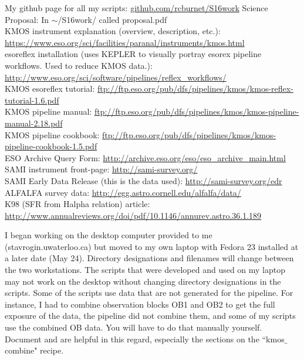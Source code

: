 \documentclass[10pt,letterpaper]{article}
\begin{document}
\begin{thebibliography}{1}
My github page for all my scripts: \url{github.com/rcburnet/S16work}
Science Proposal: In $\sim$/S16work/ called proposal.pdf\\
KMOS instrument explanation (overview, description, etc.): \url{https://www.eso.org/sci/facilities/paranal/instruments/kmos.html}\\
esoreflex installation (uses KEPLER to visually portray esorex pipeline workflows. Used to reduce KMOS data.): \url{http://www.eso.org/sci/software/pipelines/reflex_workflows/}\\
KMOS esoreflex tutorial: \url{ftp://ftp.eso.org/pub/dfs/pipelines/kmos/kmos-reflex-tutorial-1.6.pdf}\\
KMOS pipeline manual: \url{ftp://ftp.eso.org/pub/dfs/pipelines/kmos/kmos-pipeline-manual-2.18.pdf}\\
KMOS pipeline cookbook: \url{ftp://ftp.eso.org/pub/dfs/pipelines/kmos/kmos-pipeline-cookbook-1.5.pdf}\\
ESO Archive Query Form: \url{http://archive.eso.org/eso/eso_archive_main.html}
SAMI instrument front-page: \url{http://sami-survey.org/}\\
SAMI Early Data Release (this is the data used): \url{http://sami-survey.org/edr}\\
ALFALFA survey data: \url{http://egg.astro.cornell.edu/alfalfa/data/}\\
K98 (SFR from Halpha relation) article: \url{http://www.annualreviews.org/doi/pdf/10.1146/annurev.astro.36.1.189}\\

\end{thebibliography}
I began working on the desktop computer provided to me (stavrogin.uwaterloo.ca) but moved to my own laptop with Fedora 23 installed at a later date (May 24). Directory designations and filenames will change between the two workstations. The scripts that were developed and used on my laptop may not work on the desktop without changing directory designations in the scripts. Some of the scripts use data that are not generated for the pipeline. For instance, I had to combine observation blocks OB1 and OB2 to get the full exposure of the data, the pipeline did not combine them, and some of my scripts use the combined OB data. You will have to do that manually yourself. Document \cite{KMOS pipeline manual} and \cite{KMOS pipeline cookbook} are helpful in this regard, especially the sections on the ``kmos$\_$combine" recipe.\\
\end{document}
